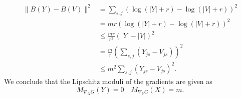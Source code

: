\begin{align}
\|B(Y)-B(V)\|^2 &=\sum_{s,j}(\log(|Y|+r)-\log(|V|+r))^2\nonumber\\
&=mr(\log(|Y|+r)-\log(|V|+r))^2\nonumber\\
&\leq \frac{mr}{r^2}(|Y|-|V|)^2\nonumber\\
&= \frac{m}{r}\left(\sum_{s,j}(Y_{j s}-V_{j s})\right)^2\nonumber\\
&\leq m^2\sum_{s,j}(Y_{j s}-V_{j s})^2.\nonumber
\end{align}
We conclude that the Lipschitz moduli of the gradients are given as
\[M_{\nabla_X G}(Y)=0 \quad M_{\nabla_YG}(X)=m.\]